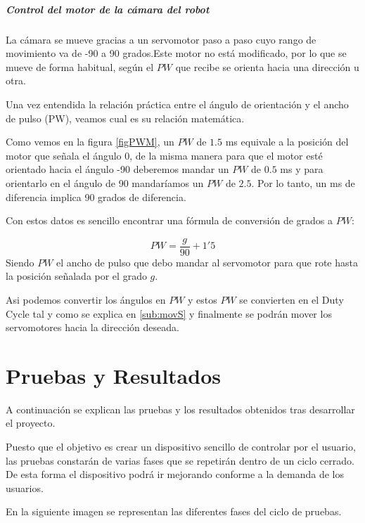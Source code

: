 \documentclass[twoside, 11pt]{epstfg}
\begin{document}
\paragraph{Control del motor de la cámara del robot}

La cámara se mueve gracias a un servomotor paso a paso cuyo rango de movimiento va de -90 a 90 grados.Este motor no está modificado, por lo que se mueve de forma habitual, según el $PW$ que recibe se orienta hacia una dirección u otra.

Una vez entendida la relación práctica entre el ángulo de orientación y el ancho de pulso (PW), veamos cual es su relación matemática.

Como vemos en la figura \ref{figPWM}, un $PW$ de $1.5$ ms equivale a la posición del motor que señala el ángulo 0, de la misma manera para que el motor esté orientado hacia el ángulo -90 deberemos mandar un $PW$ de $0.5$ ms y para orientarlo en el ángulo de 90 mandaríamos un $PW$ de $2.5$. Por lo tanto, un ms de diferencia implica 90 grados de diferencia.

Con estos datos es sencillo encontrar una fórmula de conversión de grados a $PW$:

$$PW = \frac{g}{90} + 1'5$$
Siendo $PW$ el ancho de pulso que debo mandar al servomotor para que rote hasta la posición señalada por el grado $g$.

Asi podemos convertir los ángulos en $PW$ y estos $PW$ se convierten en el Duty Cycle tal y como se explica en \ref{sub:movS} y finalmente se podrán mover los servomotores hacia la dirección deseada.


\chapter{Pruebas y Resultados}

A continuación se explican las pruebas y los resultados obtenidos tras desarrollar el proyecto.

Puesto que el objetivo es crear un dispositivo sencillo de controlar por el usuario, las pruebas constarán de varias fases que se repetirán dentro de un ciclo cerrado. De esta forma el dispositivo podrá ir mejorando conforme a la demanda de los usuarios.

En la siguiente imagen se representan las diferentes fases del ciclo de pruebas.
\end{document}
